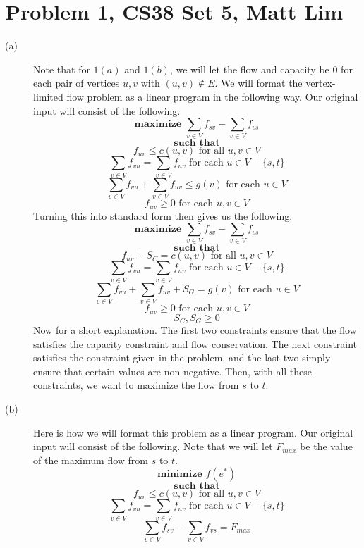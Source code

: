 \documentclass{article}
\begin{document}
\section*{Problem 1, CS38 Set 5, Matt Lim}
\begin{description}
    \item[(a)]
        Note that for $1(a)$ and $1(b)$, we will let the flow and capacity be 0
        for each pair of vertices $u,v$ with $(u,v) \notin E$.
        We will format the vertex-limited flow problem as a linear program in
        the following way. Our original input will consist of the following.
        \[ \textbf{maximize } \sum_{v \in V} f_{sv} - \sum_{v \in V} f_{vs} \]
        \[ \textbf{such that} \]
        \[ f_{uv} \leq c(u,v) \text{ for all $u,v \in V$} \]
        \[ \sum_{v \in V} f_{vu} = \sum_{v \in V} f_{uv} \text{ for each $u \in
        V - \{s,t\}$} \]
        \[ \sum_{v \in V} f_{vu} + \sum_{v \in V} f_{uv} \leq g(v) \text{ for each $u \in
        V$} \]
        \[ f_{uv} \ge 0 \text{ for each $u,v \in V$} \]
        Turning this into standard form then gives us the following.
        \[ \textbf{maximize } \sum_{v \in V} f_{sv} - \sum_{v \in V} f_{vs} \]
        \[ \textbf{such that} \]
        \[ f_{uv} + S_C = c(u,v) \text{ for all $u,v \in V$} \]
        \[ \sum_{v \in V} f_{vu} = \sum_{v \in V} f_{uv} \text{ for each $u \in
        V - \{s,t\}$} \]
        \[ \sum_{v \in V} f_{vu} + \sum_{v \in V} f_{uv} + S_G = g(v) \text{ for each $u \in
        V$} \]
        \[ f_{uv} \ge 0 \text{ for each $u,v \in V$} \]
        \[ S_C, S_G \ge 0 \]
        Now for a short explanation. The first two constraints ensure that the
        flow satisfies the capacity constraint and flow conservation. The next
        constraint satisfies the constraint given in the problem, and the last
        two simply ensure that certain values are non-negative. Then, with all
        these constraints, we want to maximize the flow from $s$ to $t$.
    \item[(b)]
        Here is how we will format this problem as a linear program. Our
        original input will consist of the following. Note that we will let
        $F_{max}$ be the value of the maximum flow from $s$ to $t$.
        \[ \textbf{minimize } f(e^*) \]
        \[ \textbf{such that} \]
        \[ f_{uv} \leq c(u,v) \text{ for all $u,v \in V$} \]
        \[ \sum_{v \in V} f_{vu} = \sum_{v \in V} f_{uv} \text{ for each $u \in
        V - \{s,t\}$} \]
        \[ \sum_{v \in V} f_{sv} - \sum_{v \in V} f_{vs} = F_{max} \]

\end{description}
\end{document}
